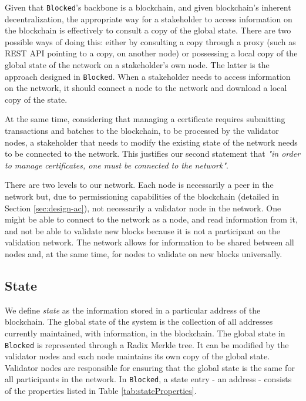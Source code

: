 Given that \texttt{Blocked}'s backbone is a blockchain, and given blockchain's inherent decentralization, the appropriate way for a stakeholder to access information on the blockchain is effectively to consult a copy of the global state. There are two possible ways of doing this: either by consulting a copy through a proxy (such as REST API pointing to a copy, on another node) or possessing a local copy of the global state of the network on a stakeholder's own node. The latter is the approach designed in \texttt{Blocked}. When a stakeholder needs to access information on the network, it should connect a node to the network and download a local copy of the state.

At the same time, considering that managing a certificate requires submitting transactions and batches to the blockchain, to be processed by the validator nodes, a stakeholder that needs to modify the existing state of the network needs to be connected to the network. This justifies our second statement that \emph{"in order to manage certificates, one must be connected to the network"}.

There are two levels to our network. Each node is necessarily a peer in the network but, due to permissioning capabilities of the blockchain (detailed in Section \ref{sec:design-ac}), not necessarily a validator node in the network. One might be able to connect to the network as a node, and read information from it, and not be able to validate new blocks because it is not a participant on the validation network. The network allows for information to be shared between all nodes and, at the same time, for nodes to validate on new blocks universally.

\subsection{State}
\label{sec:design-state}

We define \textit{state} as the information stored in a particular address of the blockchain. The global state of the system is the collection of all addresses currently maintained, with information, in the blockchain. The global state in \texttt{Blocked} is represented through a Radix Merkle tree. It can be modified by the validator nodes and each node maintains its own copy of the global state. Validator nodes are responsible for ensuring that the global state is the same for all participants in the network. In \texttt{Blocked}, a state entry - an address - consists of the properties listed in Table \ref{tab:stateProperties}.

